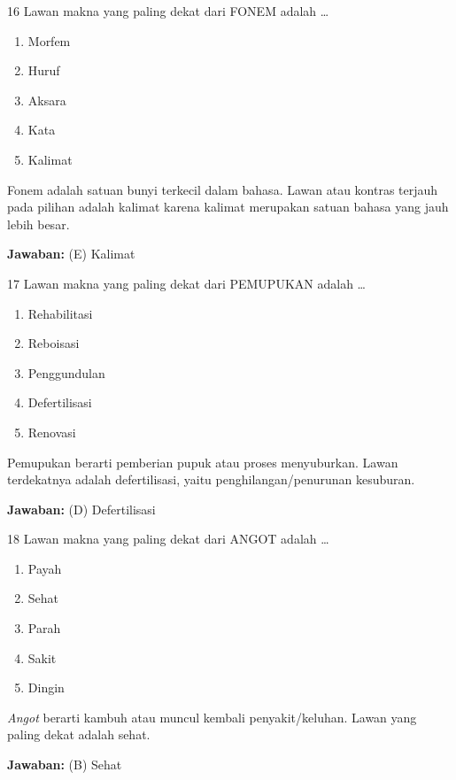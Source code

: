 \documentclass[11pt]{article}
\newenvironment{pil}{\begin{enumerate}[label=(\Alph*),leftmargin=*,itemsep=1pt,topsep=3pt]}{\end{enumerate}}
\newcommand{\jw}[1]{\par\smallskip\begin{jawbox}\textbf{Jawaban:} #1\end{jawbox}}
\begin{document}
\begin{soalbox}{1}{6}
Lawan makna yang paling dekat dari FONEM adalah \ldots
\begin{pil}\item Morfem \item Huruf \item Aksara \item Kata \item Kalimat\end{pil}
\end{soalbox}
\begin{pembox}
Fonem adalah satuan bunyi terkecil dalam bahasa. Lawan atau kontras terjauh pada pilihan adalah kalimat karena kalimat merupakan satuan bahasa yang jauh lebih besar.
\jw{(E) Kalimat}
\end{pembox}

\begin{soalbox}{1}{7}
Lawan makna yang paling dekat dari PEMUPUKAN adalah \ldots
\begin{pil}\item Rehabilitasi \item Reboisasi \item Penggundulan \item Defertilisasi \item Renovasi\end{pil}
\end{soalbox}
\begin{pembox}
Pemupukan berarti pemberian pupuk atau proses menyuburkan. Lawan terdekatnya adalah defertilisasi, yaitu penghilangan/penurunan kesuburan.
\jw{(D) Defertilisasi}
\end{pembox}

\begin{soalbox}{1}{8}
Lawan makna yang paling dekat dari ANGOT adalah \ldots
\begin{pil}\item Payah \item Sehat \item Parah \item Sakit \item Dingin\end{pil}
\end{soalbox}
\begin{pembox}
\emph{Angot} berarti kambuh atau muncul kembali penyakit/keluhan. Lawan yang paling dekat adalah sehat.
\jw{(B) Sehat}
\end{pembox}
\end{document}
